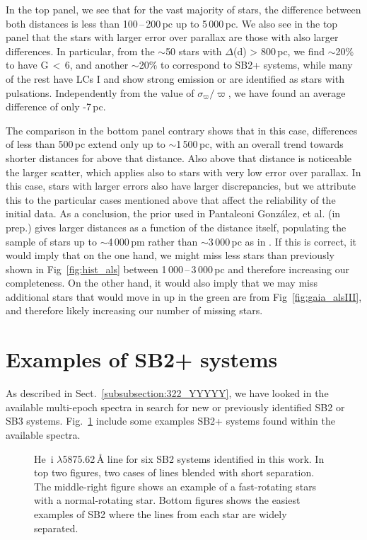 \documentclass{aa}
\begin{document}
\begin{appendix}
In the top panel, we see that for the vast majority of stars, the difference between both distances is less than 100\,--\,200\,pc up to 5\,000\,pc. We also see in the top panel that the stars with larger error over parallax are those with also larger differences. In particular, from the $\sim$50 stars with $\Delta$(d) > 800\,pc, we find $\sim$20\% to have G\,$<$\,6, and another $\sim$20\% to correspond to SB2+ systems, while many of the rest have LCs I and show strong emission or are identified as stars with pulsations. Independently from the value of $\sigma_{\varpi}/\varpi$, we have found an average difference of only -7\,pc.

The comparison in the bottom panel contrary shows that in this case, differences of less than 500\,pc extend only up to $\sim$1\,500\,pc, with an overall trend towards shorter distances for \citep{2021AJ....161..147B} above that distance. Also above that distance is noticeable the larger scatter, which applies also to stars with very low error over parallax. In this case, stars with larger errors also have larger discrepancies, but we attribute this to the particular cases mentioned above that affect the reliability of the initial data. As a conclusion, the prior used in Pantaleoni González, et al. (in prep.) gives larger distances as a function of the distance itself, populating the sample of stars up to $\sim$4\,000\,pm rather than $\sim$3\,000\,pc as in \citep{2021AJ....161..147B}. If this is correct, it would imply that on the one hand, we might miss less stars than previously shown in Fig~\ref{fig:hist_als} between 1\,000\,--\,3\,000\,pc and therefore increasing our completeness. On the other hand, it would also imply that we may miss additional stars that would move in up in the green are from Fig~\ref{fig:gaia_alsIII}, and therefore likely increasing our number of missing stars.


\section{Examples of SB2+ systems}
\label{apen.sb2}

As described in Sect.~\ref{subsubsection:322_YYYYY}, we have looked in the available multi-epoch spectra in search for new or previously identified SB2 or SB3 systems. Fig.~\ref{fig:sb2} include some examples SB2+ systems found within the available spectra.

\begin{figure}[htbp]
    \centering
    \caption{He~{\sc i} $\lambda$5875.62\,{\AA} line for six SB2 systems identified in this work. In top two figures, two cases of lines blended with short separation. The middle-right figure shows an example of a fast-rotating stars with a normal-rotating star. Bottom figures shows the easiest examples of SB2 where the lines from each star are widely separated.}
    \label{fig:sb2}
\end{figure}


\end{appendix}
\end{document}
